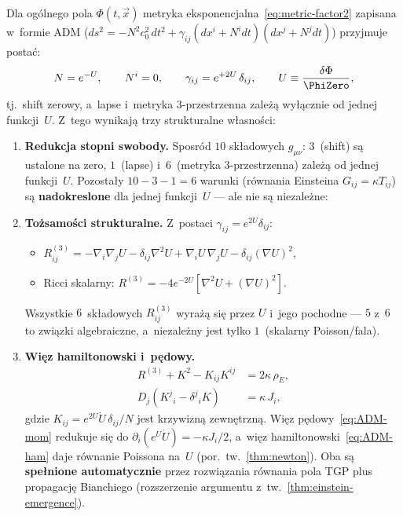 \begin{proposition}\label{prop:ADM-TGP}
Dla og\'olnego pola $\Phi(t,\vec{x})$ metryka
eksponencjalna~\eqref{eq:metric-factor2} zapisana w~formie
ADM ($ds^2 = -N^2 c_0^2\,dt^2 + \gamma_{ij}(dx^i + N^i dt)(dx^j + N^j dt)$)
przyjmuje posta\'c:
\begin{equation}\label{eq:ADM-TGP}
  N = e^{-U}, \qquad N^i = 0, \qquad
  \gamma_{ij} = e^{+2U}\,\delta_{ij},
  \qquad U \equiv \frac{\delta\Phi}{\PhiZero},
\end{equation}
tj.\ shift zerowy, a~lapse i~metryka $3$-przestrzenna
zale\.z\k{a} wy\l{}\k{a}cznie od jednej funkcji~$U$.
Z~tego wynikaj\k{a} trzy strukturalne w\l{}asno\'sci:
\begin{enumerate}[nosep]
  \item \textbf{Redukcja stopni swobody.}
    Sposr\'od $10$ sk\l{}adowych $g_{\mu\nu}$:
    $3$~(shift) s\k{a} ustalone na zero,
    $1$~(lapse) i~$6$~(metryka $3$-przestrzenna) zale\.z\k{a}
    od jednej funkcji~$U$.
    Pozosta\l{}y $10 - 3 - 1 = 6$ warunki (r\'ownania Einsteina
    $G_{ij} = \kappa T_{ij}$) s\k{a}
    \textbf{nadokreslone} dla jednej funkcji~$U$ ---
    ale nie s\k{a} niezale\.zne:

  \item \textbf{To\.zsamo\'sci strukturalne.}
    Z~postaci $\gamma_{ij} = e^{2U}\delta_{ij}$:
    \begin{itemize}[nosep]
      \item $R^{(3)}_{ij} = -\nabla_i\nabla_j U
        - \delta_{ij}\nabla^2 U + \nabla_i U\,\nabla_j U
        - \delta_{ij}(\nabla U)^2$,
      \item Ricci skalarny: $R^{(3)} = -4e^{-2U}
        [\nabla^2 U + (\nabla U)^2]$.
    \end{itemize}
    Wszystkie $6$~sk\l{}adowych $R^{(3)}_{ij}$ wyra\.z\k{a}
    si\k{e} przez $U$ i~jego pochodne --- $5$ z~$6$
    to zwi\k{a}zki algebraiczne, a~niezale\.zny jest
    tylko $1$~(skalarny Poisson/fala).

  \item \textbf{Wi\k{e}z hamiltonowski i~p\k{e}dowy.}
    \begin{align}
      R^{(3)} + K^2 - K_{ij}K^{ij} &= 2\kappa\,\rho_E,
        \label{eq:ADM-ham}\\
      D_j(K^j{}_i - \delta^j{}_i K) &= \kappa\,J_i,
        \label{eq:ADM-mom}
    \end{align}
    gdzie $K_{ij} = e^{2U}\dot{U}\,\delta_{ij}/N$
    jest krzywizn\k{a} zewn\k{e}trzn\k{a}. Wi\k{e}z
    p\k{e}dowy~\eqref{eq:ADM-mom} redukuje si\k{e} do
    $\partial_i(e^U\dot{U}) = -\kappa J_i/2$,
    a~wi\k{e}z hamiltonowski~\eqref{eq:ADM-ham}
    daje r\'ownanie Poissona na~$U$
    (por.\ tw.~\ref{thm:newton}).
    Oba s\k{a} \textbf{spe\l{}nione automatycznie}
    przez rozwi\k{a}zania r\'ownania pola TGP
    plus propagacj\k{e} Bianchiego
    (rozszerzenie argumentu z~tw.~\ref{thm:einstein-emergence}).
\end{enumerate}
\end{proposition}

